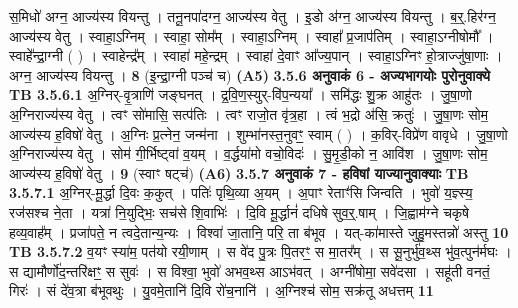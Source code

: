 \documentclass[17pt]{extarticle}
\begin{document}
{{{{{{{{{{{{{{{{{{{                  स॒मिधो॑ अग्न॒ आज्य॑स्य वियन्तु । तनू॒नपा॑दग्न॒ आज्य॑स्य वेतु । इ॒डो अ॑ग्न॒ आज्य॑स्य वियन्तु । ब॒र्॒.हिर॑ग्न॒ आज्य॑स्य वेतु । स्वाहा॒ऽग्निम् । स्वाहा॒ सोम᳚म् । स्वाहा॒ऽग्निम् । स्वाहा᳚ प्र॒जाप॑तिम् । स्वाहा॒ऽग्नीषोमौ᳚ । स्वाहे᳚न्द्रा॒ग्नी ( ) । स्वाहेन्द्र᳚म् । स्वाहा॑ महे॒न्द्रम् । स्वाहा॑ दे॒वाꣳ आ᳚ज्य॒पान् । स्वाहा॒ऽग्निꣳ हो॒त्राज्जु॑षा॒णाः । अग्न॒ आज्य॑स्य वियन्तु । \textbf{ 8} \newline
                  \newline
                                    (इ॒न्द्रा॒ग्नी पञ्च॑ च) \textbf{(A5)} \newline \newline
                \textbf{ 3.5.6     अनुवाकं   6 - अज्यभागयोः पुरोनुवाक्ये} \newline
                                \textbf{ TB 3.5.6.1} \newline
                  अ॒ग्निर्-वृ॒त्राणि॑ जङ्घनत् । द्र॒वि॒ण॒स्युर्-वि॑प॒न्यया᳚ । समि॑द्धः शु॒क्र आहु॑तः । जु॒षा॒णो अ॒ग्निराज्य॑स्य वेतु । त्वꣳ सो॑मासि॒ सत्प॑तिः । त्वꣳ राजो॒त वृ॑त्र॒हा । त्वं भ॒द्रो अ॑सि॒ क्रतुः॑ । जु॒षा॒णः सोम॒ आज्य॑स्य ह॒विषो॑ वेतु । अ॒ग्निः प्र॒त्नेन॒ जन्म॑ना । शुम्भा॑नस्त॒नुवꣳ॒॒ स्वाम् ( ) । क॒विर्-विप्रे॑ण वावृधे । जु॒षा॒णो अ॒ग्निराज्य॑स्य वेतु । सोम॑ गी॒र्भिष्ट्वा॑ व॒यम् । व॒र्द्धया॑मो वचो॒विदः॑ । सु॒मृ॒डी॒को न॒ आवि॑श । जु॒षा॒णः सोम॒ आज्य॑स्य ह॒विषो॑ वेतु । \textbf{ 9} \newline
                  \newline
                                    (स्वाꣳ षट्च॑) \textbf{(A6)} \newline \newline
                \textbf{ 3.5.7     अनुवाकं   7 - हविषां याज्यानुवाक्याः} \newline
                                \textbf{ TB 3.5.7.1} \newline
                  अ॒ग्निर्-मू॒र्द्धा दि॒वः क॒कुत् । पतिः॑ पृथि॒व्या अ॒यम् । अ॒पाꣳ रेताꣳ॑सि जिन्वति । भुवो॑ य॒ज्ञ्स्य॒ रज॑सश्च ने॒ता । यत्रा॑ नि॒युद्भिः॒ सच॑से शि॒वाभिः॑ । दि॒वि मू॒र्द्धानं॑ दधिषे सुव॒र्॒.षाम् । जि॒ह्वाम॑ग्ने चकृषे हव्य॒वाह᳚म् । प्रजा॑पते॒ न त्वदे॒तान्य॒न्यः । विश्वा॑ जा॒तानि॒ परि॒ ता ब॑भूव । यत्-का॑मास्ते जुहु॒मस्तन्नो॑ अस्तु \textbf{ 10} \newline
                  \newline
                                \textbf{ TB 3.5.7.2} \newline
                  व॒यꣳ स्या॑म॒ पत॑यो रयी॒णाम् । स वे॑द पु॒त्रः पि॒तरꣳ॒॒ स मा॒तर᳚म् । स सू॒नुर्भु॑व॒थ्स भु॑व॒त्पुन॑र्मघः । स द्यामौर्णो॑द॒न्तरि॑क्षꣳ॒॒ स सुवः॑ । स विश्वा॒ भुवो॑ अभव॒थ्स आऽभ॑वत् । अग्नी॑षोमा॒ सवे॑दसा । सहू॑ती वनतं॒ गिरः॑ । सं दे॑व॒त्रा ब॑भूवथुः । यु॒वमे॒तानि॑ दि॒वि रो॑च॒नानि॑ । अ॒ग्निश्च॑ सोम॒ सक्र॑तू अधत्तम् \textbf{ 11} \newline
}}}}}}}}}}}}}}}}}}}
\end{document}
